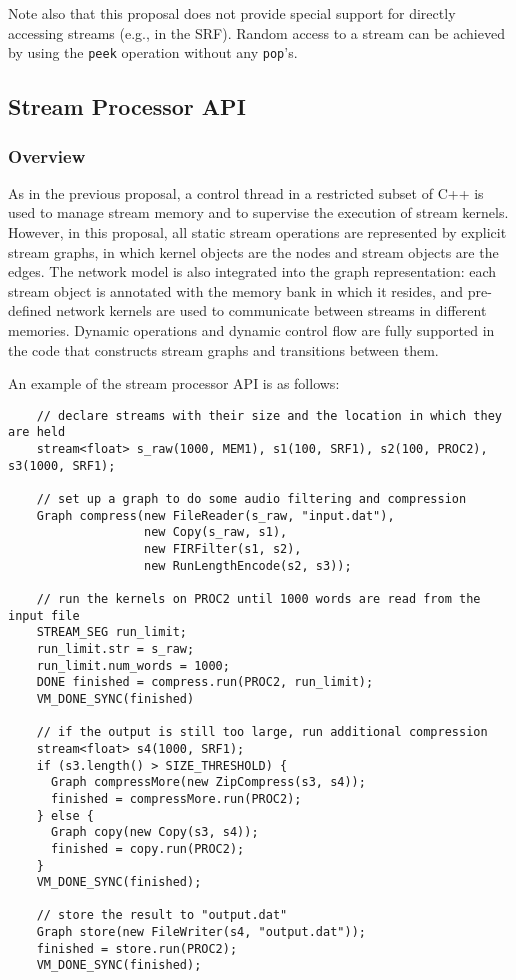 Note also that this proposal does not provide special support for
directly accessing streams (e.g., in the SRF).  Random access to a
stream can be achieved by using the {\tt peek} operation without any
{\tt pop}'s.

\subsection{Stream Processor API}

\subsubsection{Overview}
\label{sec:streamover}

As in the previous proposal, a control thread in a restricted subset
of C++ is used to manage stream memory and to supervise the execution
of stream kernels.  However, in this proposal, all static stream
operations are represented by explicit stream graphs, in which kernel
objects are the nodes and stream objects are the edges.  The network
model is also integrated into the graph representation: each stream
object is annotated with the memory bank in which it resides, and
pre-defined network kernels are used to communicate between streams in
different memories.  Dynamic operations and dynamic control flow are
fully supported in the code that constructs stream graphs and
transitions between them.

An example of the stream processor API is as follows:
{\small
\begin{verbatim}
    // declare streams with their size and the location in which they are held
    stream<float> s_raw(1000, MEM1), s1(100, SRF1), s2(100, PROC2), s3(1000, SRF1);

    // set up a graph to do some audio filtering and compression
    Graph compress(new FileReader(s_raw, "input.dat"),
                   new Copy(s_raw, s1),
                   new FIRFilter(s1, s2),
                   new RunLengthEncode(s2, s3));

    // run the kernels on PROC2 until 1000 words are read from the input file
    STREAM_SEG run_limit;
    run_limit.str = s_raw;
    run_limit.num_words = 1000;
    DONE finished = compress.run(PROC2, run_limit);
    VM_DONE_SYNC(finished)

    // if the output is still too large, run additional compression
    stream<float> s4(1000, SRF1);
    if (s3.length() > SIZE_THRESHOLD) {
      Graph compressMore(new ZipCompress(s3, s4));
      finished = compressMore.run(PROC2);
    } else {
      Graph copy(new Copy(s3, s4));
      finished = copy.run(PROC2);
    }
    VM_DONE_SYNC(finished);

    // store the result to "output.dat"
    Graph store(new FileWriter(s4, "output.dat"));
    finished = store.run(PROC2);
    VM_DONE_SYNC(finished);
\end{verbatim}}

